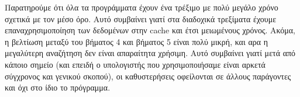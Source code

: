 \documentclass{article}
\begin{document}
Παρατηρούμε ότι όλα τα προγράμματα έχουν ένα τρέξιμο με πολύ μεγάλο χρόνο σχετικά με τον μέσο όρο. Αυτό συμβαίνει γιατί στα διαδοχικά τρεξίματα έχουμε επαναχρησιμοποίηση των δεδομένων στην cache και έτσι μειωμένους χρόνος. Ακόμα, η βελτίωση μεταξύ του βήματος 4 και βήματος 5 είναι πολύ μικρή, και αρα η μεγαλύτερη αναζήτηση δεν είναι απαραίτητα χρήσιμη. Αυτό συμβαίνει γιατί μετά από κάποιο σημείο (και επειδή ο υπολογιστής που χρησιμοποιήσαμε είναι αρκετά σύγχρονος και γενικού σκοπού), οι καθυστερήσεις οφείλονται σε άλλους παράγοντες και όχι στο ίδιο το πρόγραμμα.
\end{document}
